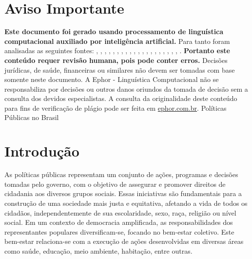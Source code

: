 \documentclass[
   article,       
   12pt,          
   oneside,       
   a4paper,       
   english,       
   brazil,        
   sumario=tradicional
   ]{abntex2}
\begin{document}
\frenchspacing 
\maketitle

\textual
\section{Aviso Importante}
\textbf{Este documento foi gerado usando processamento de linguística computacional auxiliado por inteligência artificial.} Para tanto foram analisadas as seguintes fontes:  \cite{A_CAUSA_E_AS_POLITICAS_DE_DIREITOS_HUMANOS_NO}, \cite{Ciclo_de_Politicas_Publicas_por_que_e_importa}, \cite{Conheca_o_ciclo_das_politicas_publicas__Polit}, \cite{Educacao_Inclusiva_Conheca_o_historico_da_leg}, \cite{Entendendo_a_Tipologia_de_Politicas_Publicas_}, \cite{Escola_Nacional_de_Administracao_Publica__Wik}, \cite{Especialista_em_politicas_publicas_e_gestao_g}, \cite{FEDERALISMO_E_POLITICAS_PUBLICAS_NO_BRASIL_Ho}, \cite{Ministerio_do_Planejamento_e_Orcamento__Wikip}, \cite{Ministro_defende_que_direitos_humanos_precisa}, \cite{Politica_conceito_politicas_publicas_e_partid}, \cite{Politica_publica__o_que_e_tipos_de_politicas_}, \cite{Politica_publica__Wikipedia_a_enciclopedia_li}, \cite{Politicas_publicas__Wikipedia_la_enciclopedia}, \cite{Politicas_Publicas_entenda_o_que_sao_para_que}, \cite{Politicas_Publicas_o_que_sao_e_para_que_serve}, \cite{Politicas_publicas_o_que_sao_e_para_que_serve}, \cite{Politicas_publicas_o_que_sao_quem_faz_e_tipos}, \cite{Politicas_publicas_o_que_sao_tipos_e_exemplos}, \cite{Revista_USP_119__Dossie_1_Democracia_e_politi}, \cite{TCU_Ciclo_das_politicas_publicas__Tudo_o_que_}.
\textbf{Portanto este conteúdo requer revisão humana, pois pode conter erros.} Decisões jurídicas, de saúde, financeiras ou similares não devem ser tomadas com base somente neste documento. A Ephor - Linguística Computacional não se responsabiliza por decisões ou outros danos oriundos da tomada de decisão sem a consulta dos devidos especialistas.
A consulta da originalidade deste conteúdo para fins de verificação de plágio pode ser feita em \href{http://www.ephor.com.br}{ephor.com.br}.
Políticas Públicas no Brasil

\section{Introdução}

As políticas públicas representam um conjunto de ações, programas e decisões tomadas pelo governo, com o objetivo de assegurar e promover direitos de cidadania aos diversos grupos sociais. Essas iniciativas são fundamentais para a construção de uma sociedade mais justa e equitativa, afetando a vida de todos os cidadãos, independentemente de sua escolaridade, sexo, raça, religião ou nível social. Em um contexto de democracia amplificada, as responsabilidades dos representantes populares diversificam-se, focando no bem-estar coletivo. Este bem-estar relaciona-se com a execução de ações desenvolvidas em diversas áreas como saúde, educação, meio ambiente, habitação, entre outras.
\end{document}
